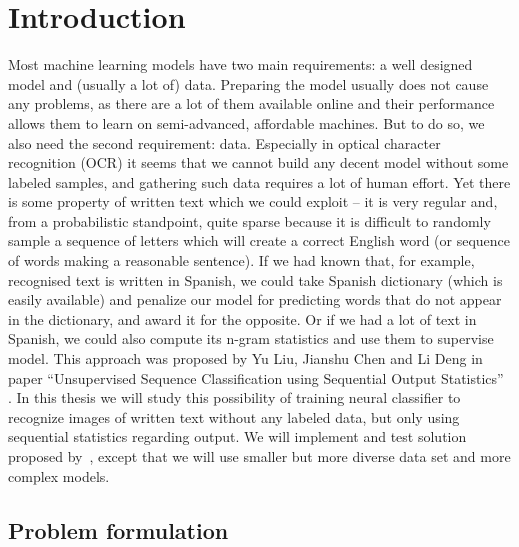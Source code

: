 \documentclass[declaration,shortabstract,lic,english]{iithesis}
\author         {Grzegorz Ciesielski}
\date          {}                     %
\begin{document}

\chapter{Introduction}

Most machine learning models have two main requirements: a well designed model and (usually a lot of) data. Preparing the model usually does not cause any problems, as there are a lot of them available online and their performance allows them to learn on semi-advanced, affordable machines. But to do so, we also need the second requirement: data. Especially in optical character recognition (OCR) it seems that we cannot build any decent model without some labeled samples, and gathering such data requires a lot of human effort. Yet there is some property of written text which we could exploit -- it is very regular and, from a probabilistic standpoint, quite sparse because it is difficult to randomly sample a sequence of letters which will create a correct English word (or sequence of words making a reasonable sentence). If we had known that, for example, recognised text is written in Spanish, we could take Spanish dictionary (which is easily available) and penalize our model for predicting words that do not appear in the dictionary, and award it for the opposite. Or if we had a lot of text in Spanish, we could also compute its n-gram statistics and use them to supervise model. This approach was proposed by Yu Liu, Jianshu Chen and Li Deng in paper ``Unsupervised Sequence Classification using Sequential Output Statistics'' \citep{liu2017unsupervised}. In this thesis we will study this possibility of training neural classifier to recognize images of written text without any labeled data, but only using sequential statistics regarding output. We will implement and test solution proposed by~\citet{liu2017unsupervised}, except that we will use smaller but more diverse data set and more complex models.

\section{Problem formulation}
\end{document}
